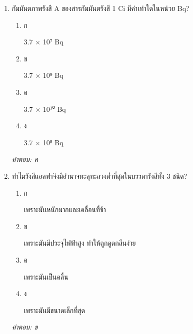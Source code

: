 \documentclass[12pt]{article}
\begin{document}
\begin{enumerate}[label=\arabic*., itemsep=0.5\baselineskip, topsep=0.5\baselineskip, leftmargin=*]
\item กัมมันตภาพรังสี A ของสารกัมมันตรังสี 1 Ci มีค่าเท่าใดในหน่วย Bq?
\begin{enumerate}[label=\alph*)., itemsep=0.3\baselineskip, topsep=0.3\baselineskip]
\item ก\ 
\begin{minipage}[t]{0.9\linewidth}
\raggedright 3.7 × 10⁷ Bq
\end{minipage}
\item ข\ 
\begin{minipage}[t]{0.9\linewidth}
\raggedright 3.7 × 10⁹ Bq
\end{minipage}
\item ค\ 
\begin{minipage}[t]{0.9\linewidth}
\raggedright 3.7 × 10¹⁰ Bq
\end{minipage}
\item ง\ 
\begin{minipage}[t]{0.9\linewidth}
\raggedright 3.7 × 10⁸ Bq
\end{minipage}
\end{enumerate}
\vspace{-0.3\baselineskip}
\begin{small}
\textit{คำตอบ: ค}
\end{small}

\item ทำไมรังสีแอลฟาจึงมีอำนาจทะลุทะลวงต่ำที่สุดในบรรดารังสีทั้ง 3 ชนิด?
\begin{enumerate}[label=\alph*)., itemsep=0.3\baselineskip, topsep=0.3\baselineskip]
\item ก\ 
\begin{minipage}[t]{0.9\linewidth}
\raggedright เพราะมันหนักมากและเคลื่อนที่ช้า
\end{minipage}
\item ข\ 
\begin{minipage}[t]{0.9\linewidth}
\raggedright เพราะมันมีประจุไฟฟ้าสูง ทำให้ถูกดูดกลืนง่าย
\end{minipage}
\item ค\ 
\begin{minipage}[t]{0.9\linewidth}
\raggedright เพราะมันเป็นคลื่น
\end{minipage}
\item ง\ 
\begin{minipage}[t]{0.9\linewidth}
\raggedright เพราะมันมีขนาดเล็กที่สุด
\end{minipage}
\end{enumerate}
\vspace{-0.3\baselineskip}
\begin{small}
\textit{คำตอบ: ข}
\end{small}


\end{enumerate}
\end{document}
